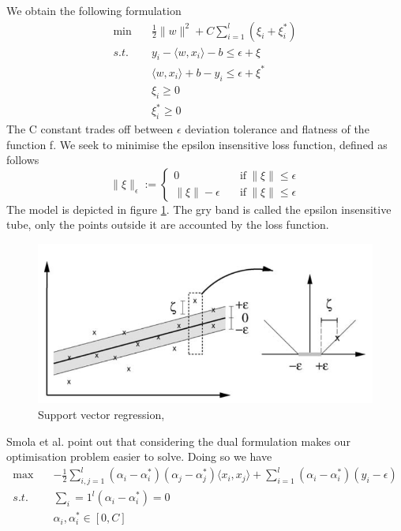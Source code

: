 We obtain the following formulation
\begin{equation}
    \begin{aligned}
        \min \quad& \frac{1}{2}\|w\|^2+C\sum\limits_{i=1}^l(\xi_i+\xi_i^*)
        \\
        s.t. \quad& y_i-\langle w, x_i\rangle-b\leq \epsilon+\xi
        \\
        \quad& \langle w, x_i\rangle +b-y_i\leq \epsilon+\xi^*
        \\
        \quad& \xi_i\geq0
        \\
        \quad& \xi_i^*\geq0
    \end{aligned}
\end{equation}
The C constant trades off between $\epsilon$ deviation tolerance and flatness of the function f.
We seek to minimise the epsilon insensitive loss function, defined as follows
\begin{equation}
    \|\xi\|_\epsilon:=\begin{cases}
        0 \quad& \textrm{if} \ \|\xi\|\leq \epsilon
        \\
        \|\xi\|-\epsilon \quad& \textrm{if} \ \|\xi\|\leq \epsilon
    \end{cases}
\end{equation}
The model is depicted in figure \ref{fig:svm_simple}. The gry band is called the epsilon insensitive tube, only the points outside it are accounted by the loss function.
\begin{figure}
    \includegraphics[width=\textwidth]{images/svm_simple.png}    
    \caption{Support vector regression,\cite{learning_with_kernels}}
    \label{fig:svm_simple}
\end{figure}
Smola et al. \cite{smola2004tutorial} point out that considering the dual formulation makes our optimisation problem easier to solve. Doing so we have
\begin{equation}
    \begin{aligned}
        \max \quad& -\frac{1}{2}\sum\limits_{i,j=1}^l(\alpha_i-\alpha_i^*)(\alpha_j-\alpha_j^*)\langle x_i,x_j\rangle +\sum\limits_{i=1}^l(\alpha_i-\alpha_i^*)(y_i-\epsilon)
        \\
        s.t. \quad& \sum\limits_i=1^l(\alpha_i-\alpha_i^*)=0
        \\
        \quad& \alpha_i, \alpha_i^* \in [0, C]
    \end{aligned}
\end{equation}
